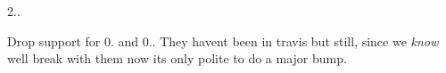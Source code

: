 2..
\begin{DoxyItemize}
\item Drop support for 0. and 0.. They haven\textquotesingle{}t been in travis but still, since we {\itshape know} we\textquotesingle{}ll break with them now it\textquotesingle{}s only polite to do a major bump. 
\end{DoxyItemize}